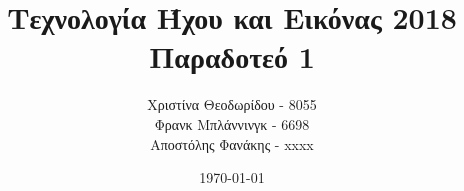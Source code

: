 \documentclass[11pt]{article}
\title{Τεχνολογία Ήχου και Εικόνας 2018\\
    Παραδοτεό 1}
\author{Χριστίνα Θεοδωρίδου - 8055\\
    Φρανκ Μπλάννινγκ - 6698\\
    Αποστόλης Φανάκης - xxxx}
\date{\today}
\begin{document}
  {\titlefont \maketitle}
  
  

    
  
  
    


  \tableofcontents

  \newpage
  
  

  
  
  
  
  

  {}
  
 
\end{document}
